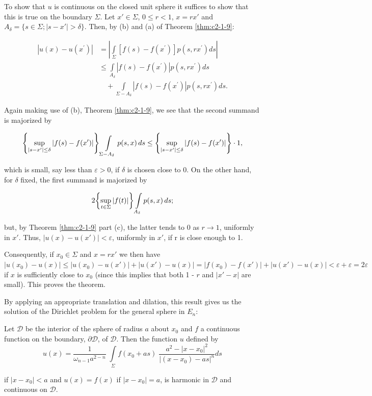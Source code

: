 To show that $u$ is continuous on the closed unit sphere it suffices to show that this is true on the boundary $\Sigma$. Let $x' \in \Sigma$, $0 \leq r < 1$, $x = rx'$ and $A_\delta = \{s \in \Sigma; |s - x'| > \delta\}$. Then, by (b) and (a) of Theorem \ref{thm:c2-1-9}:

\[
\begin{aligned}|u(x)-u(x^{\prime})|&=\left|\int\limits_{\Sigma}[f(s)-f(x^{\prime})]p(s,rx^{\prime})ds\right|\\&\leq\int\limits_{A_\delta}|f(s)-f(x^{\prime})|p(s,rx^{\prime})ds\\&\quad+\int\limits_{\Sigma-A_\delta}|f(s)-f(x^{\prime})|p(s,rx^{\prime})ds.\end{aligned}
\]

Again making use of (b), Theorem \ref{thm:c2-1-9}, we see that the second summand is majorized by

\[
\left\{\sup_{|s-x^{\prime}|\leq\delta}|f(s)-f(x^{\prime})|\right\}\intop_{\Sigma-A_{\delta}}p(s,x)\,ds\leq\left\{\sup_{|s-x^{\prime}|\leq\delta}|f(s)-f(x^{\prime})|\right\}\cdot1,
\]

which is small, say less than $\varepsilon > 0$, if $\delta$ is chosen close to 0. On the other hand, for $\delta$ fixed, the first summand is majorized by

\[
2\biggl\{\sup_{t\in\Sigma}|f(t)|\biggr\}\intop_{A_{\delta}}p(s,x)\,ds;
\]

but, by Theorem \ref{thm:c2-1-9} part (c), the latter tends to 0 as $r \to 1$, uniformly in $x'$. Thus, $|u(x) - u(x')| < \varepsilon$, uniformly in $x'$, if r is close enough to 1.

Consequently, if $x_0 \in \Sigma$ and $x = rx'$ we then have $|u(x_0) - u(x)| \leq |u(x_0) - u(x')| + |u(x') - u(x)| = |f(x_0) - f(x')| + |u(x') - u(x)| < \varepsilon + \varepsilon = 2\varepsilon$ if $x$ is sufficiently close to $x_0$ (since this implies that both 1 - $r$ and $|x' - x|$ are small). This proves the theorem.

By applying an appropriate translation and dilation, this result gives us the solution of the Dirichlet problem for the general sphere in $E_{n}$:

\begin{corollary}
\label{cor:c2-1-11}
Let $\mathcal{D}$ be the interior of the sphere of radius $a$ about $x_0$ and $f$ a continuous function on the boundary, $\partial\mathcal{D}$, of $\mathcal{D}$. Then the function $u$ defined by
\[
u(x)=\frac{1}{\omega_{n-1}a^{2-n}}\;\int\limits_{\Sigma}f(x_{0}+a s)\;\frac{a^{2}-|x-x_{0}|^{2}}{|(x-x_{0})-a s|^{n}}d s
\]

if $|x - x_0| < a$ and $u(x) = f(x)$ if $|x - x_0| = a$, is harmonic in $\mathcal{D}$ and continuous on $\mathcal{D}$.
\end{corollary}


